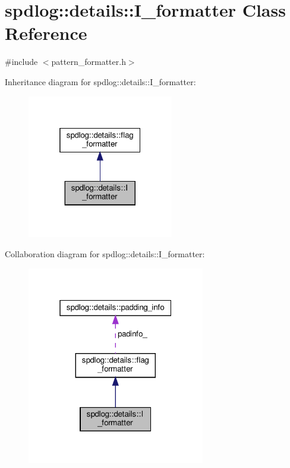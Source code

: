 \hypertarget{classspdlog_1_1details_1_1_i__formatter}{}\section{spdlog\+:\+:details\+:\+:I\+\_\+formatter Class Reference}
\label{classspdlog_1_1details_1_1_i__formatter}


{\ttfamily \#include $<$pattern\+\_\+formatter.\+h$>$}



Inheritance diagram for spdlog\+:\+:details\+:\+:I\+\_\+formatter\+:
\nopagebreak
\begin{figure}[H]
\begin{center}
\leavevmode
\includegraphics[width=181pt]{classspdlog_1_1details_1_1_i__formatter__inherit__graph}
\end{center}
\end{figure}


Collaboration diagram for spdlog\+:\+:details\+:\+:I\+\_\+formatter\+:
\nopagebreak
\begin{figure}[H]
\begin{center}
\leavevmode
\includegraphics[width=220pt]{classspdlog_1_1details_1_1_i__formatter__coll__graph}
\end{center}
\end{figure}
